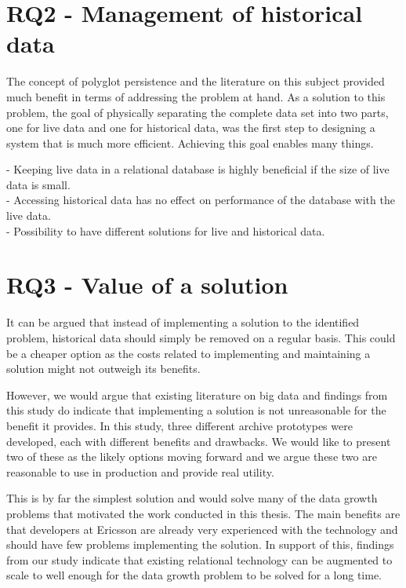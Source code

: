 \section{RQ2 - Management of historical data}
The concept of polyglot persistence and the literature on this subject provided much benefit in terms of addressing the problem at hand. As a solution to this problem, the goal of physically separating the complete data set into two parts, one for live data and one for historical data, was the first step to designing a system that is much more efficient. Achieving this goal enables many things. 

- Keeping live data in a relational database is highly beneficial if the size of live data is small. \\
- Accessing historical data has no effect on performance of the database with the live data. \\
- Possibility to have different solutions for live and historical data. \\


\section{RQ3 - Value of a solution}
It can be argued that instead of implementing a solution to the identified problem, historical data should simply be removed on a regular basis. This could be a cheaper option as the costs related to implementing and maintaining a solution might not outweigh its benefits. 

However, we would argue that existing literature on big data and findings from this study do indicate that implementing a solution is not unreasonable for the benefit it provides. In this study, three different archive prototypes were developed, each with different benefits and drawbacks. We would like to present two of these as the likely options moving forward and we argue these two are reasonable to use in production and provide real utility.

This is by far the simplest solution and would solve many of the data growth problems that motivated the work conducted in this thesis. The main benefits are that developers at Ericsson are already very experienced with the technology and should have few problems implementing the solution. In support of this, findings from our study indicate that existing relational technology can be augmented to scale to well enough for the data growth problem to be solved for a long time.

